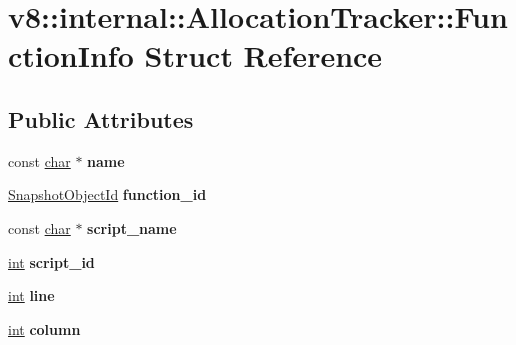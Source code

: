 \hypertarget{structv8_1_1internal_1_1AllocationTracker_1_1FunctionInfo}{}\section{v8\+:\+:internal\+:\+:Allocation\+Tracker\+:\+:Function\+Info Struct Reference}
\label{structv8_1_1internal_1_1AllocationTracker_1_1FunctionInfo}
\subsection*{Public Attributes}
\begin{DoxyCompactItemize}
\item 
\mbox{\label{structv8_1_1internal_1_1AllocationTracker_1_1FunctionInfo_ae33f02d99a3e461828e2656809c77b2f}} 
const \mbox{\hyperlink{classchar}{char}} $\ast$ {\bfseries name}
\item 
\mbox{\label{structv8_1_1internal_1_1AllocationTracker_1_1FunctionInfo_a5ba77f100a28524f998ba3efd87771f4}} 
\mbox{\hyperlink{classuint32__t}{Snapshot\+Object\+Id}} {\bfseries function\+\_\+id}
\item 
\mbox{\label{structv8_1_1internal_1_1AllocationTracker_1_1FunctionInfo_a5e617e59a73c7aeb154eb48504f1e879}} 
const \mbox{\hyperlink{classchar}{char}} $\ast$ {\bfseries script\+\_\+name}
\item 
\mbox{\label{structv8_1_1internal_1_1AllocationTracker_1_1FunctionInfo_a3a8b62dc5e0a9adac5805d16cdebd54a}} 
\mbox{\hyperlink{classint}{int}} {\bfseries script\+\_\+id}
\item 
\mbox{\label{structv8_1_1internal_1_1AllocationTracker_1_1FunctionInfo_ac110826fbee56f72da27e835ec5b5150}} 
\mbox{\hyperlink{classint}{int}} {\bfseries line}
\item 
\mbox{\label{structv8_1_1internal_1_1AllocationTracker_1_1FunctionInfo_a71c34c3ca4aac838c46922665be8c856}} 
\mbox{\hyperlink{classint}{int}} {\bfseries column}
\end{DoxyCompactItemize}


